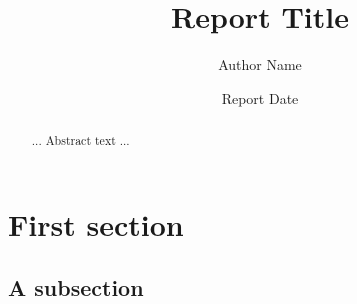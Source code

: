 \documentclass[12pt,oneside]{report}
\title{Report Title}
\date{Report Date}
\author{Author Name}
\begin{document}
\maketitle

\begin{abstract} ... Abstract text ... \end{abstract}
\declaration
\dedication{...dedication text...}

\tableofcontents
{}
\newpage
{}
\section{First section}
\subsection{A subsection}
 
%
\end{document}
